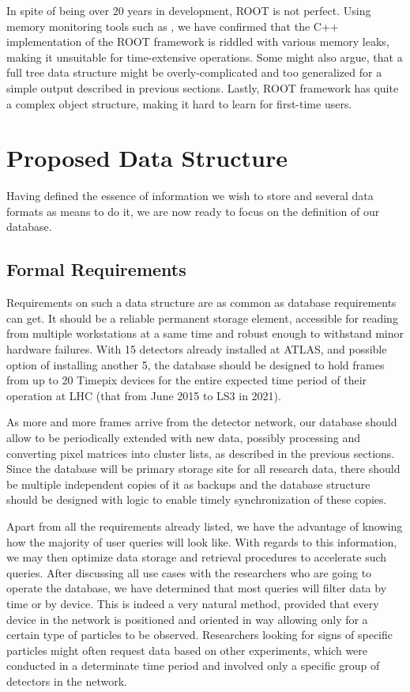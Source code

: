 In spite of being over 20 years in development, ROOT is not perfect. Using memory monitoring tools such as \cite{nethercote2007valgrind}, we have confirmed that the C++ implementation of the ROOT framework is riddled with various memory leaks, making it unsuitable for time-extensive operations. Some might also argue, that a full tree data structure might be overly-complicated and too generalized for a simple output described in previous sections. Lastly, ROOT framework has quite a complex object structure, making it hard to learn for first-time users.


\section{Proposed Data Structure}
Having defined the essence of information we wish to store and several data formats as means to do it, we are now ready to focus on the definition of our database. 

\subsection{Formal Requirements}
Requirements on such a data structure are as common as database requirements can get. It should be a reliable permanent storage element, accessible for reading from multiple workstations at a same time and robust enough to withstand minor hardware failures. With 15 detectors already installed at ATLAS, and possible option of installing another 5, the database should be designed to hold frames from up to 20 Timepix devices for the entire expected time period of their operation at LHC (that from June 2015 to LS3 in 2021).


As more and more frames arrive from the detector network, our database should allow to be periodically extended with new data, possibly processing and converting pixel matrices into cluster lists, as described in the previous sections. Since the database will be primary storage site for all research data, there should be multiple independent copies of it as backups and the database structure should be designed with logic to enable timely synchronization of these copies.

Apart from all the requirements already listed, we have the advantage of knowing how the majority of user queries will look like. With regards to this information, we may then optimize data storage and retrieval procedures to accelerate such queries. After discussing all use cases with the researchers who are going to operate the database, we have determined that most queries will filter data by time or by device. This is indeed a very natural method, provided that every device in the network is positioned and oriented in way allowing only for a certain type of particles to be observed. Researchers looking for signs of specific particles might often request data based on other experiments, which were conducted in a determinate time period and involved only a specific group of detectors in the network.


